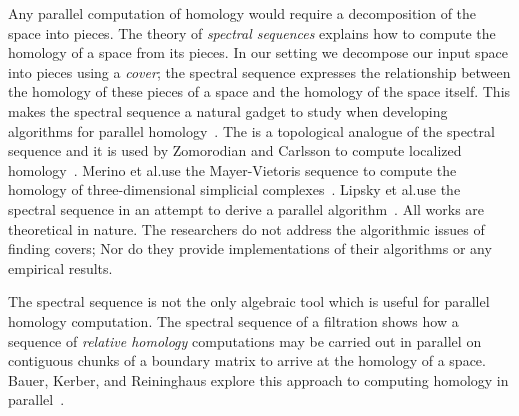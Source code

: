 \documentclass{jocg}
\begin{document}
Any parallel computation of homology would require a decomposition of the
space into pieces.  The theory of \emph{spectral sequences} explains how to 
compute the homology of a space from its pieces. In our setting we decompose 
our input space into pieces using a \emph{cover}; the \mv spectral sequence expresses 
the relationship between the homology of these pieces of a space and the homology of the space itself.
This makes the \mv spectral sequence  a natural gadget to study when developing algorithms for parallel homology~\cite{hatcher}. 
The \mvb{} is a topological analogue of the \mv spectral sequence and it is used by 
Zomorodian and Carlsson to compute localized homology~\cite{zc-lh-08}.  
Merino et al.\@ use the Mayer-Vietoris sequence to compute the homology of
three-dimensional simplicial complexes~\cite{bmlf-cmv-10}.  
Lipsky et al.\@ use the \mv spectral sequence in an attempt to derive a parallel algorithm~\cite{lsv-ss-11}. 
All works are theoretical in nature. The researchers do not address the algorithmic issues of finding covers;  
Nor do they provide implementations of their algorithms or any empirical results. 

The \mv spectral sequence is not the only algebraic tool which is useful for parallel homology computation.
The spectral sequence of a filtration shows how a sequence of \emph{relative homology} computations may be carried out
in parallel on contiguous chunks of a boundary matrix to arrive at the homology of a space. 
Bauer, Kerber, and Reininghaus explore this approach to computing homology in parallel~\cite{bkr-cccph-13}. 
\end{document}
